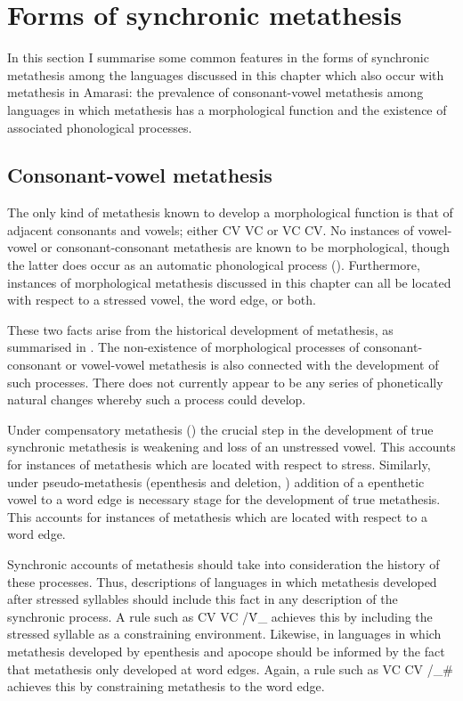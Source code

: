 \section{Forms of synchronic metathesis}\label{sec:For ch:SynchMet}
In this section I summarise some common features in the forms
of synchronic metathesis among the languages discussed in this chapter
which also occur with metathesis in Amarasi:
the prevalence of consonant-vowel metathesis among
languages in which metathesis has a morphological function
and the existence of associated phonological processes.

\subsection{Consonant-vowel metathesis}
The only kind of metathesis known to develop
a morphological function is that of adjacent consonants and vowels;
either CV {\ra} VC or VC {\ra} CV.
No instances of vowel-vowel or consonant-consonant
metathesis are known to be morphological,
though the latter does occur as an automatic
phonological process ().
Furthermore, instances of morphological metathesis
discussed in this chapter can all be located with respect
to a stressed vowel, the word edge, or both.

These two facts arise from the historical development
of metathesis, as summarised in .
The non-existence of morphological processes
of consonant- consonant or vowel-vowel metathesis
is also connected with the development of such processes.
There does not currently appear to be any series of
phonetically natural changes whereby such a process could develop.

Under compensatory metathesis () the crucial step in the development of
true synchronic metathesis is weakening and loss of an unstressed vowel.
This accounts for instances of metathesis which are located with respect to stress.
Similarly, under pseudo-metathesis (epenthesis and deletion, )
addition of a epenthetic vowel to a word edge is necessary
stage for the development of true metathesis.
This accounts for instances of metathesis which
are located with respect to a word edge.

Synchronic accounts of metathesis should take into
consideration the history of these processes.
Thus, descriptions of languages in which metathesis developed after stressed syllables
should include this fact in any description of the synchronic process.
A rule such as CV {\ra} VC /\'V{\_} achieves this by including
the stressed syllable as a constraining environment.
Likewise, in languages in which metathesis developed by epenthesis and apocope
should be informed by the fact that metathesis only developed at word edges.
Again, a rule such as VC {\ra} CV /{\_}{\#} achieves this 
by constraining metathesis to the word edge.

